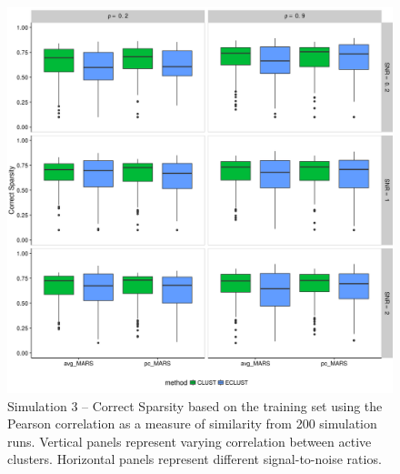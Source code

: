 \begin{appendices}
\begin{figure}[H]
	\centering
	\includegraphics[scale=0.6, keepaspectratio]{./figs/hydra/results/figures/sim3-sept27/CorrectSparsity_Correlation_sim3.png}
	\caption{Simulation 3 -- Correct Sparsity based on the training set using the Pearson correlation as a measure of similarity from 200 simulation runs. Vertical panels represent varying correlation between active clusters. Horizontal panels represent different signal-to-noise ratios.}
	\label{fig:CorrectSparsity_Correlation_sim3}
\end{figure}



\end{appendices}
